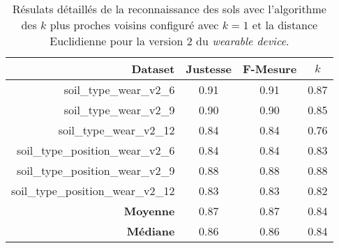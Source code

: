 \begin{table}[H]\renewcommand{\arraystretch}{0.5}
	\centering
	\caption{Résulats détaillés de la reconnaissance des sols avec l'algorithme des $k$ plus proches voisins configuré avec $k=1$ et la distance Euclidienne pour la version 2 du \textit{wearable device}.}
	\label{tab:tab:knn-dE-wear-v2}
	\begin{tabular}{@{}rccc@{}}
		\toprule
			\textbf{Dataset} & \textbf{Justesse} & \textbf{F-Mesure} & \textbf{$k$} \\
		\midrule
			soil\_type\_wear\_v2\_6 & 0.91 & 0.91 & 0.87 \\
			soil\_type\_wear\_v2\_9 & 0.90 & 0.90 & 0.85 \\
			soil\_type\_wear\_v2\_12 & 0.84 & 0.84 & 0.76 \\
			soil\_type\_position\_wear\_v2\_6 & 0.84 & 0.84 & 0.83 \\
			soil\_type\_position\_wear\_v2\_9 & 0.88 & 0.88 & 0.88 \\
			soil\_type\_position\_wear\_v2\_12 & 0.83 & 0.83 & 0.82 \\
			\textbf{Moyenne} & 0.87 & 0.87 & 0.84 \\
			\textbf{Médiane} & 0.86 & 0.86 & 0.84 \\
		\bottomrule
	\end{tabular}
\end{table}

